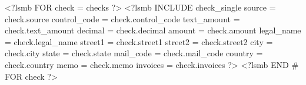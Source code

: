 \documentclass{scrartcl}
\begin{document}
\pagestyle{myheadings}
\thispagestyle{empty}

\fontsize{9pt}{9pt}\selectfont
<?lsmb FOR check = checks ?>
<?lsmb INCLUDE check_single 
	source = check.source
	control_code = check.control_code
	text_amount = check.text_amount
	decimal = check.decimal
	amount = check.amount
	legal_name = check.legal_name
	street1 = check.street1 
	street2 = check.street2 
	city = check.city
	state = check.state
	mail_code = check.mail_code
	country = check.country
	memo = check.memo
	invoices = check.invoices
?>
\clearpage
<?lsmb END # FOR check ?>
\end{document}
